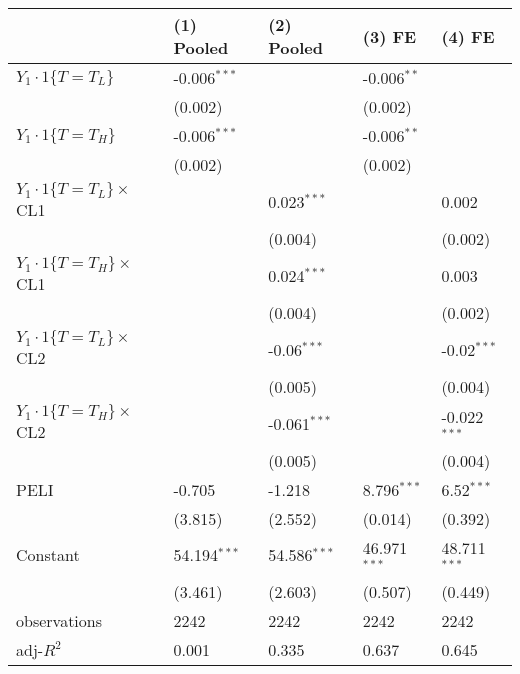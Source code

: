 \begin{tabular}{lllll}
\hline
 & (1) Pooled & (2) Pooled & (3) FE & (4) FE \\
\hline
$Y_1\cdot1\{T=T_L\}$ & -0.006$^{***}$ &  & -0.006$^{**}$ &  \\
 & (0.002) &  & (0.002) &  \\
$Y_1\cdot1\{T=T_H\}$ & -0.006$^{***}$ &  & -0.006$^{**}$ &  \\
 & (0.002) &  & (0.002) &  \\
$Y_1\cdot1\{T=T_L\}\times$CL1 &  & 0.023$^{***}$ &  & 0.002 \\
 &  & (0.004) &  & (0.002) \\
$Y_1\cdot1\{T=T_H\}\times$CL1 &  & 0.024$^{***}$ &  & 0.003 \\
 &  & (0.004) &  & (0.002) \\
$Y_1\cdot1\{T=T_L\}\times$CL2 &  & -0.06$^{***}$ &  & -0.02$^{***}$ \\
 &  & (0.005) &  & (0.004) \\
$Y_1\cdot1\{T=T_H\}\times$CL2 &  & -0.061$^{***}$ &  & -0.022$^{***}$ \\
 &  & (0.005) &  & (0.004) \\
PELI & -0.705 & -1.218 & 8.796$^{***}$ & 6.52$^{***}$ \\
 & (3.815) & (2.552) & (0.014) & (0.392) \\
Constant & 54.194$^{***}$ & 54.586$^{***}$ & 46.971$^{***}$ & 48.711$^{***}$ \\
 & (3.461) & (2.603) & (0.507) & (0.449) \\\hline

observations & 2242 & 2242 & 2242 & 2242 \\
adj-$R^2$ & 0.001 & 0.335 & 0.637 & 0.645 \\
\hline
\end{tabular}
